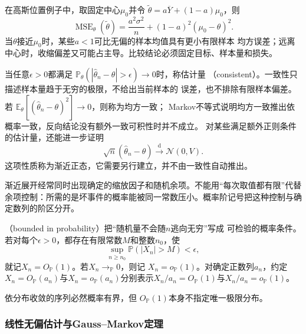 在高斯位置例子中，取固定中心\(\mu_0\)并令
\(\widetilde\theta=a\overline Y+(1-a)\mu_0\)，则
\[
  \operatorname{MSE}_\theta(\widetilde\theta)
  =\frac{a^2\sigma^2}{n}+(1-a)^2(\mu_0-\theta)^2.
\]
当\(\theta\)接近\(\mu_0\)时，某些\(a<1\)可比无偏的样本均值具有更小有限样本
均方误差；远离中心时，收缩偏差又可能占主导。比较结论必须固定目标、样本量和损失。

当任意\(\epsilon>0\)都满足
\(\mathbb{P}_\theta(|\widehat\theta_n-\theta|>\epsilon)\to0\)时，称估计量
（consistent）。一致性只描述样本量趋于无穷的极限，不给出当前样本的
误差，也不排除有限样本偏差。若
\(\mathbb{E}_\theta[(\widehat\theta_n-\theta)^2]\to0\)，则称为均方一致；
Markov不等式说明均方一致推出依概率一致，反向结论没有额外一致可积性时并不成立。
对某些满足额外正则条件的估计量，还能进一步证明
\[
  \sqrt n(\widehat\theta_n-\theta)
  \xrightarrow{\mathrm d}\mathcal N(0,V).
\]
这项性质称为渐近正态，它需要另行建立，并不由一致性自动推出。

渐近展开经常同时出现确定的缩放因子和随机余项。不能用“每次取值都有限”代替余项控制：所需的是坏事件的概率能被同一常数压小。概率阶记号把这种控制与确定数列的阶区分开。
\begin{definition}[概率阶记号]
  \label{def:statistics-probability-order}
（bounded in probability）把“随机量不会随\(n\)逃向无穷”写成
可检验的概率条件。若对每个\(\epsilon>0\)，都存在有限常数\(M\)和整数\(n_0\)，使
\[
  \sup_{n\geq n_0}\mathbb{P}(|X_n|>M)<\epsilon,
\]
就记\(X_n=O_{\mathbb{P}}(1)\)。若\(X_n\to_{\mathbb{P}}0\)，则记
\(X_n=o_{\mathbb{P}}(1)\)。对确定正数列\(a_n\)，约定\(X_n=O_{\mathbb P}(a_n)\)与\(X_n=o_{\mathbb P}(a_n)\)分别表示\(X_n/a_n=O_{\mathbb P}(1)\)与\(X_n/a_n=o_{\mathbb P}(1)\)。
\end{definition}
依分布收敛的序列必然概率有界，但
\(O_{\mathbb{P}}(1)\)本身不指定唯一极限分布。

\subsubsection{线性无偏估计与Gauss--Markov定理}

